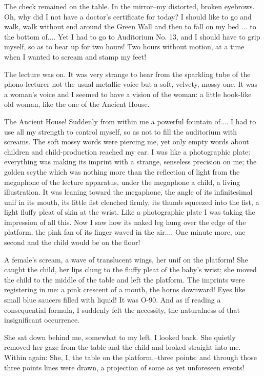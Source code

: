 \documentclass[11pt,openany]{book}
\begin{document}
The check remained on the table. In the mirror--my distorted, broken eyebrows. Oh, why did I not have a doctor's certificate for today? I should like to go and walk, walk without end around the Green Wall and then to fall on my bed ... to the bottom of.... Yet I had to go to Auditorium No. 13, and I should have to grip myself, so as to bear up for two hours! Two hours without motion, at a time when I wanted to scream and stamp my feet!

The lecture was on. It was very strange to hear from the sparkling tube of the phono-lecturer not the usual metallic voice but a soft, velvety, mossy one. It was a woman's voice and I seemed to have a vision of the woman: a little hook-like old woman, like the one of the Ancient House.

The Ancient House! Suddenly from within me a powerful fountain of.... I had to use all my strength to control myself, so as not to fill the auditorium with screams. The soft mossy words were piercing me, yet only empty words about children and child-production reached my ear. I was like a photographic plate: everything was making its imprint with a strange, senseless precision on me; the golden scythe which was nothing more than the reflection of light from the megaphone of the lecture apparatus, under the megaphone a child, a living illustration. It was leaning toward the megaphone, the angle of its infinitesimal unif in its mouth, its little fist clenched firmly, its thumb squeezed into the fist, a light fluffy pleat of skin at the wrist. Like a photographic plate I was taking the impression of all this. Now I saw how its naked leg hung over the edge of the platform, the pink fan of its finger waved in the air.... One minute more, one second and the child would be on the floor!

A female's scream, a wave of translucent wings, her unif on the platform! She caught the child, her lips clung to the fluffy pleat of the baby's wrist; she moved the child to the middle of the table and left the platform. The imprints were registering in me: a pink crescent of a mouth, the horns downward! Eyes like small blue saucers filled with liquid! It was O-90. And as if reading a consequential formula, I suddenly felt the necessity, the naturalness of that insignificant occurrence.

She sat down behind me, somewhat to my left. I looked back. She quietly removed her gaze from the table and the child and looked straight into me. Within again: She, I, the table on the platform,--three points: and through those three points lines were drawn, a projection of some as yet unforeseen events!
\end{document}
